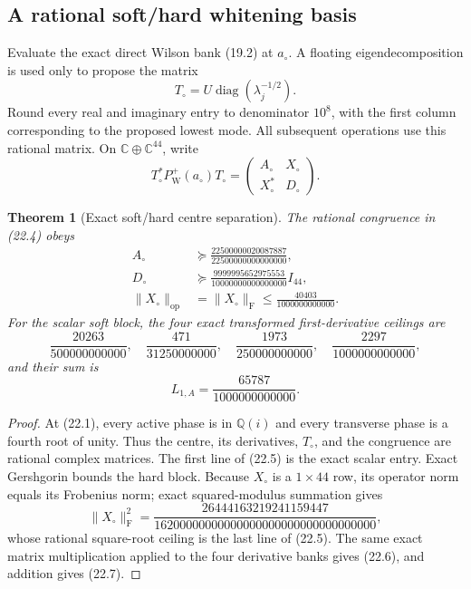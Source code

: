 \documentclass[11pt,oneside]{article}
\newtheorem{theorem}{Theorem}[section]
\theoremstyle{definition}
\theoremstyle{remark}
\begin{document}
\subsection{A rational soft/hard whitening basis}

Evaluate the exact direct Wilson bank (19.2) at \(a_\circ\).
A floating eigendecomposition is used only to propose the matrix
\[
 T_\circ=U\operatorname{diag}(\lambda_j^{-1/2}).
                                                               \tag{22.3}
\]
Round every real and imaginary entry to denominator \(10^8\), with
the first column corresponding to the proposed lowest mode.  All
subsequent operations use this rational matrix.  On
\(\mathbb C\oplus\mathbb C^{44}\), write
\[
 T_\circ^*P_{\mathrm W}^+(a_\circ)T_\circ
 =
 \begin{pmatrix}A_\circ&X_\circ\\
 X_\circ^*&D_\circ\end{pmatrix}.                         \tag{22.4}
\]

\begin{theorem}[Exact soft/hard centre separation]
\label{thm:newv22-centre}
The rational congruence in (22.4) obeys
\[
\begin{aligned}
 A_\circ&\succeq
 \frac{22500000020087887}{22500000000000000},\\
 D_\circ&\succeq
 \frac{9999995652975553}{10000000000000000}I_{44},\\
 \|X_\circ\|_{\mathrm{op}}
 &=\|X_\circ\|_{\mathrm F}
 \le\frac{40403}{1000000000000}.
\end{aligned}                                            \tag{22.5}
\]
For the scalar soft block, the four exact transformed
first-derivative ceilings are
\[
 \frac{20263}{500000000000},\quad
 \frac{471}{31250000000},\quad
 \frac{1973}{250000000000},\quad
 \frac{2297}{1000000000000},                             \tag{22.6}
\]
and their sum is
\[
 L_{1,A}=\frac{65787}{1000000000000}.                    \tag{22.7}
\]
\end{theorem}

\begin{proof}
At (22.1), every active phase is in
\(\mathbb Q(i)\) and every transverse phase is a fourth root of
unity.  Thus the centre, its derivatives, \(T_\circ\), and the
congruence are rational complex matrices.  The first line of (22.5)
is the exact scalar entry.  Exact Gershgorin bounds the hard block.
Because \(X_\circ\) is a \(1\times44\) row, its operator norm equals
its Frobenius norm; exact squared-modulus summation gives
\[
 \|X_\circ\|_{\mathrm F}^2
 =
 \frac{26444163219241159447}
 {16200000000000000000000000000000000},                 \tag{22.8}
\]
whose rational square-root ceiling is the last line of (22.5).
The same exact matrix multiplication applied to the four derivative
banks gives (22.6), and addition gives (22.7).
\end{proof}
\end{document}

